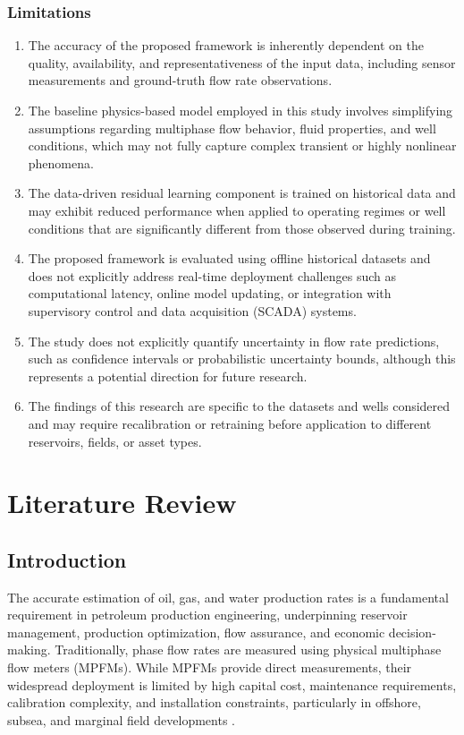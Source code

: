 \documentclass[12pt,APA]{uomthesis}
\begin{document}
\subsection{Limitations}
\begin{enumerate}
    \item The accuracy of the proposed framework is inherently dependent on the quality, availability, and representativeness of the input data, including sensor measurements and ground-truth flow rate observations.

    \item The baseline physics-based model employed in this study involves simplifying assumptions regarding multiphase flow behavior, fluid properties, and well conditions, which may not fully capture complex transient or highly nonlinear phenomena.

    \item The data-driven residual learning component is trained on historical data and may exhibit reduced performance when applied to operating regimes or well conditions that are significantly different from those observed during training.

    \item The proposed framework is evaluated using offline historical datasets and does not explicitly address real-time deployment challenges such as computational latency, online model updating, or integration with supervisory control and data acquisition (SCADA) systems.

    \item The study does not explicitly quantify uncertainty in flow rate predictions, such as confidence intervals or probabilistic uncertainty bounds, although this represents a potential direction for future research.

    \item The findings of this research are specific to the datasets and wells considered and may require recalibration or retraining before application to different reservoirs, fields, or asset types.

\end{enumerate}


\chapter{Literature Review}
\label{ch:literature}

\section{Introduction}
The accurate estimation of oil, gas, and water production rates is a fundamental requirement in petroleum production engineering, underpinning reservoir management, production optimization, flow assurance, and economic decision-making. Traditionally, phase flow rates are measured using physical multiphase flow meters (MPFMs). While MPFMs provide direct measurements, their widespread deployment is limited by high capital cost, maintenance requirements, calibration complexity, and installation constraints, particularly in offshore, subsea, and marginal field developments \citep{corneliussen2005handbook,meribout2020multiphase,hansen2019multi}.
\end{document}
